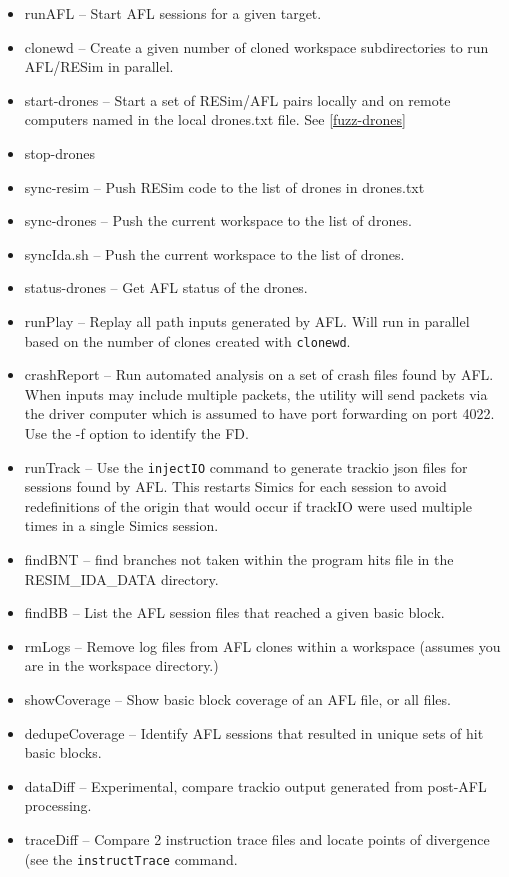 \documentclass[titlepage]{article}
\begin{document}
\begin{itemize}
\item runAFL -- Start AFL sessions for a given target.
\item clonewd -- Create a given number of cloned workspace subdirectories to run AFL/RESim in parallel.
\item start-drones -- Start a set of RESim/AFL pairs locally and on remote computers named in the local drones.txt file. See \ref{fuzz-drones}
\item stop-drones
\item sync-resim -- Push RESim code to the list of drones in drones.txt
\item sync-drones -- Push the current workspace to the list of drones.
\item syncIda.sh -- Push the current workspace to the list of drones.
\item status-drones -- Get AFL status of the drones.
\item runPlay -- Replay all path inputs generated by AFL.  Will run in parallel based on the number of clones created with {\tt clonewd}.
\item crashReport -- Run automated analysis on a set of crash files found by AFL.  When inputs may include multiple packets, the utility
will send packets via the driver computer which is assumed to have port forwarding on port 4022.   Use the -f option
to identify the FD.
\item runTrack -- Use the {\tt injectIO} command to generate trackio json files for sessions found by AFL. This restarts Simics for each session
to avoid redefinitions of the origin that would occur if trackIO were used multiple times in a single Simics session.
\item findBNT -- find branches not taken within the program hits file in the RESIM\_IDA\_DATA directory.
\item findBB -- List the AFL session files that reached a given basic block.
\item rmLogs -- Remove log files from AFL clones within a workspace (assumes you are in the workspace directory.)
\item showCoverage -- Show basic block coverage of an AFL file, or all files.
\item dedupeCoverage -- Identify AFL sessions that resulted in unique sets of hit basic blocks.
\item dataDiff -- Experimental, compare trackio output generated from post-AFL processing.
\item traceDiff -- Compare 2 instruction trace files and locate points of divergence (see the {\tt instructTrace} command.

\end{itemize}
\end{document}
